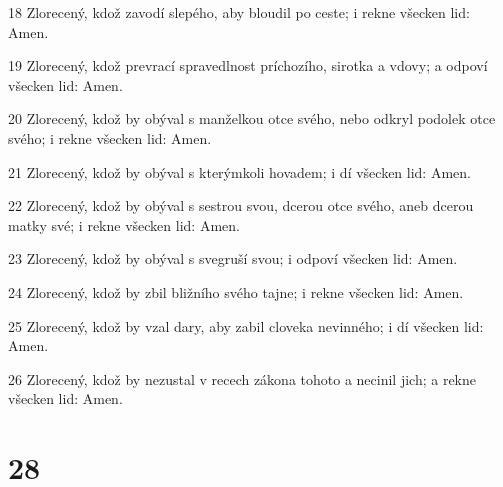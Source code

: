 \par 18 Zlorecený, kdož zavodí slepého, aby bloudil po ceste; i rekne všecken lid: Amen.
\par 19 Zlorecený, kdož prevrací spravedlnost príchozího, sirotka a vdovy; a odpoví všecken lid: Amen.
\par 20 Zlorecený, kdož by obýval s manželkou otce svého, nebo odkryl podolek otce svého; i rekne všecken lid: Amen.
\par 21 Zlorecený, kdož by obýval s kterýmkoli hovadem; i dí všecken lid: Amen.
\par 22 Zlorecený, kdož by obýval s sestrou svou, dcerou otce svého, aneb dcerou matky své; i rekne všecken lid: Amen.
\par 23 Zlorecený, kdož by obýval s svegruší svou; i odpoví všecken lid: Amen.
\par 24 Zlorecený, kdož by zbil bližního svého tajne; i rekne všecken lid: Amen.
\par 25 Zlorecený, kdož by vzal dary, aby zabil cloveka nevinného; i dí všecken lid: Amen.
\par 26 Zlorecený, kdož by nezustal v recech zákona tohoto a necinil jich; a rekne všecken lid: Amen.

\chapter{28}

